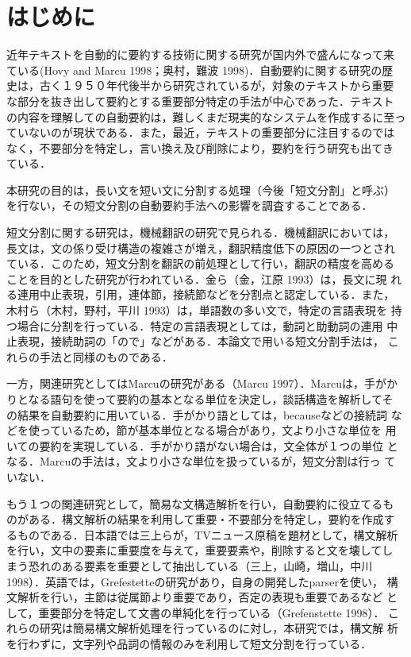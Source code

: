 \section{はじめに}
近年テキストを自動的に要約する技術に関する研究が国内外で盛んになって来
ている(Hovy and Marcu 1998；奥村，難波 1998)．自動要約に関する研究の歴
史は，古く１９５０年代後半から研究されているが，対象のテキストから重要
な部分を抜き出して要約とする重要部分特定の手法が中心であった．テキスト
の内容を理解しての自動要約は，難しくまだ現実的なシステムを作成するに至っ
ていないのが現状である．また，最近，テキストの重要部分に注目するのでは
なく，不要部分を特定し，言い換え及び削除により，要約を行う研究も出てき
ている．

本研究の目的は，長い文を短い文に分割する処理（今後「短文分割」と呼ぶ）
を行ない，その短文分割の自動要約手法への影響を調査することである．

短文分割に関する研究は，機械翻訳の研究で見られる．機械翻訳においては，
長文は，文の係り受け構造の複雑さが増え，翻訳精度低下の原因の一つとされ
ている．このため，短文分割を翻訳の前処理として行い，翻訳の精度を高める
ことを目的とした研究が行われている．金ら（金，江原 1993）は，長文に現
れる連用中止表現，引用，連体節，接続節などを分割点と認定している．また，
木村ら（木村，野村，平川 1993）は，単語数の多い文で，特定の言語表現を
持つ場合に分割を行っている．特定の言語表現としては，動詞と助動詞の連用
中止表現，接続助詞の「ので」などがある．本論文で用いる短文分割手法は，
これらの手法と同様のものである．

一方，関連研究としてはMarcuの研究がある（Marcu 1997）．Marcuは，手がか
りとなる語句を使って要約の基本となる単位を決定し，談話構造を解析してそ
の結果を自動要約に用いている．手がかり語としては，becauseなどの接続詞
などを使っているため，節が基本単位となる場合があり，文より小さな単位を
用いての要約を実現している．手がかり語がない場合は，文全体が１つの単位
となる．Marcuの手法は，文より小さな単位を扱っているが，短文分割は行っ
ていない．

もう１つの関連研究として，簡易な文構造解析を行い，自動要約に役立てるも
のがある．構文解析の結果を利用して重要・不要部分を特定し，要約を作成す
るものである．日本語では三上らが，TVニュース原稿を題材として，構文解析
を行い，文中の要素に重要度を与えて，重要要素や，削除すると文を壊してし
まう恐れのある要素を重要として抽出している（三上，山崎，増山，中川 
1998）．英語では，Grefestetteの研究があり，自身の開発したparserを使い，
構文解析を行い，主節は従属節より重要であり，否定の表現も重要であるなど
として，重要部分を特定して文書の単純化を行っている（Grefenstette 1998）．
これらの研究は簡易構文解析処理を行っているのに対し，本研究では，構文解
析を行わずに，文字列や品詞の情報のみを利用して短文分割を行っている．

